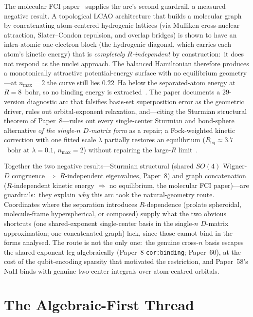 \documentclass[aps,pra,twocolumn,superscriptaddress,longbibliography]{revtex4-2}
\begin{document}
The molecular FCI paper~\cite{loutey_fci_mol} supplies the arc's second
guardrail, a measured negative result.  A topological LCAO architecture that builds a
molecular graph by concatenating atom-centered hydrogenic lattices
(via Mulliken cross-nuclear attraction, Slater--Condon repulsion, and
overlap bridges) is shown to have an intra-atomic one-electron block
(the hydrogenic diagonal, which carries each atom's kinetic energy) that is \emph{completely $R$-independent} by
construction:\ it does not respond as the
nuclei approach.  The balanced Hamiltonian therefore produces a
monotonically attractive potential-energy surface with no equilibrium
geometry---at $n_{\max}=2$ the curve still lies $0.22$~Ha below the
separated-atom energy at $R=8$~bohr, so no binding energy is
extracted~\cite{loutey_fci_mol}.  The paper documents a $29$-version
diagnostic arc that falsifies basis-set superposition error as the
geometric driver, rules out orbital-exponent relaxation, and---citing
the Sturmian structural theorem of Paper~8---rules out every
single-center Sturmian and bond-sphere alternative \emph{of the
single-$n$ $D$-matrix form} as a repair; a
Fock-weighted kinetic correction with one fitted scale $\lambda$ partially restores an
equilibrium ($R_{\mathrm{eq}} \approx 3.7$~bohr at $\lambda = 0.1$,
$n_{\max}=2$) without repairing the large-$R$ limit~\cite{loutey_fci_mol,
loutey_paper8}.

Together the two negative results---Sturmian structural (shared
$SO(4)$ Wigner-$D$ congruence $\Rightarrow$ $R$-independent eigenvalues,
Paper~8) and graph
concatenation ($R$-independent kinetic energy $\Rightarrow$ no
equilibrium, the molecular FCI paper)---are guardrails:\ they explain
\emph{why} this arc took the natural-geometry route.  Coordinates where
the separation introduces
$R$-dependence (prolate spheroidal, molecule-frame hyperspherical, or
composed) supply what the two obvious shortcuts (one shared-exponent
single-center basis in the single-$n$ $D$-matrix approximation; one
concatenated graph) lack, since those cannot bind in the forms analysed.
The route is not the only one:\ the genuine cross-$n$ basis
escapes the shared-exponent leg algebraically (Paper~8 \texttt{cor:binding}; Paper~60), at the
cost of the qubit-encoding sparsity that motivated the restriction, and
Paper~58's NaH binds with genuine two-center integrals over atom-centred
orbitals.

\section{The Algebraic-First Thread}
\label{sec:algebraic}
\end{document}
